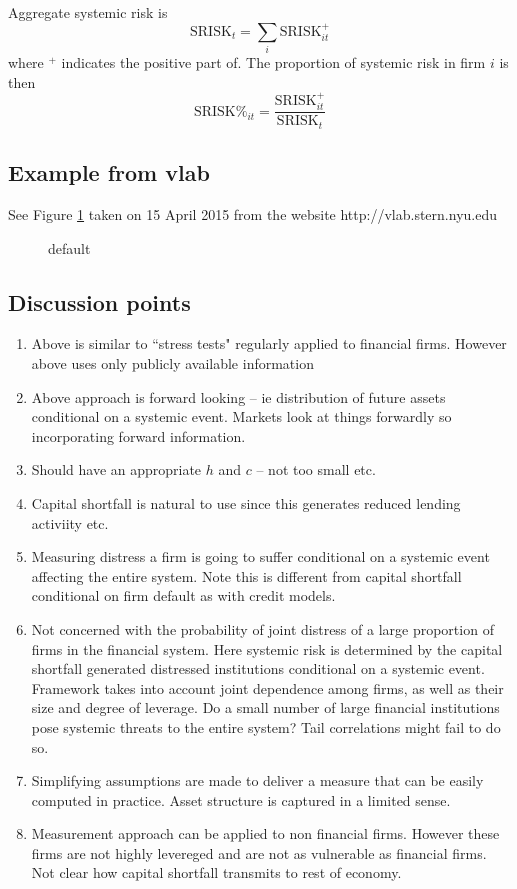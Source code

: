 \documentclass[authoryear]{elsarticle}
\newcommand{\fref}[1]{Figure \ref{#1}}
\begin{document}
Aggregate systemic risk is 
$$
\mathrm{SRISK}_t = \sum_i \mathrm{SRISK}^+_{it}
$$
where $^+$ indicates the positive part of.   
   The proportion of systemic risk in firm $i$ is then
$$
\mathrm{SRISK\%}_{it} = \frac{\mathrm{SRISK}_{it}^+}{\mathrm{SRISK}_{t}}
$$ 

\subsection{Example from vlab}
See \fref{vlab} taken on 15 April 2015 from the website http://vlab.stern.nyu.edu

\begin{figure}[htbp]
\caption{default}\label{vlab}
\begin{center}
\end{center}
\end{figure}

\subsection{Discussion points}

\begin{enumerate}
\item  Above is similar to ``stress tests" regularly applied to financial firms.   However above uses only publicly available information
\item  Above approach is forward looking -- ie distribution of future assets conditional on a systemic event.  Markets look at things forwardly so incorporating forward information.
\item  Should have an appropriate $h$ and $c$ -- not too small etc.
\item  Capital shortfall is natural to use since this generates reduced lending activiity etc.
\item Measuring distress a firm is going to suffer conditional on a systemic event affecting the entire system.   Note this is different from capital shortfall conditional on firm default as with credit models.
\item Not concerned with the probability of joint distress of a large proportion of firms in the financial system.   Here systemic risk is determined by the capital shortfall generated distressed institutions conditional on a systemic event.  Framework takes into account joint dependence among firms, as well as their size and degree of leverage.   Do a small number of large financial institutions pose systemic threats to the entire system?  Tail correlations might fail to do so.
\item  Simplifying assumptions are made to deliver a measure that can be easily computed in practice.    Asset structure is captured in a limited sense.   
\item   Measurement approach can be applied to non financial firms.   However these firms are not highly levereged and are not as vulnerable as financial firms.    Not clear how capital shortfall transmits to rest of economy.   

\end{enumerate}
\end{document}
